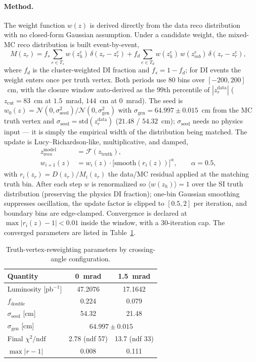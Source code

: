 \documentclass[11pt]{article}
\begin{document}
\paragraph{Method.} The weight function $w(z)$ is derived directly from the data
reco distribution with no closed-form Gaussian assumption. Under a candidate
weight, the mixed-MC reco distribution is built event-by-event,
\begin{equation}
  M(z_r) = f_s\!\!\sum_{e\in T_s}\! w(z^e_h)\,\delta(z_r-z^e_r)
         + f_d\!\!\sum_{e\in T_d}\! w(z^e_h)\,w(z^e_{mb})\,\delta(z_r-z^e_r),
\end{equation}
where $f_d$ is the cluster-weighted DI fraction and $f_s=1-f_d$; for DI events the
weight enters once per truth vertex. Both periods use $80$ bins over
$[-200,200]$~cm, with the closure window auto-derived as the $99$th percentile of
$|z_r^{\mathrm{data}}|$ ($z_{\mathrm{cut}}=83$~cm at $1.5$~mrad, $144$~cm at
$0$~mrad). The seed is
$w_0(z)=\mathcal{N}(0,\sigma_{\mathrm{seed}}^2)/\mathcal{N}(0,\sigma_{\mathrm{gen}}^2)$
with $\sigma_{\mathrm{gen}}=64.997\pm0.015$~cm from the MC truth vertex and
$\sigma_{\mathrm{seed}}=\mathrm{std}(z_r^{\mathrm{data}})$ ($21.48$ / $54.32$~cm);
$\sigma_{\mathrm{seed}}$ needs no physics input --- it is simply the empirical
width of the distribution being matched. The update is Lucy--Richardson-like,
multiplicative, and damped,
\begin{align}
  z_{\mathrm{reco}}^{\mathrm{model}} &= \mathcal{F}(z_{\mathrm{truth}}), \\
  w_{i+1}(z) &= w_i(z) \cdot \big[\mathrm{smooth}(r_i(z))\big]^{\alpha},
  \qquad \alpha=0.5,
\end{align}
with $r_i(z_r)=D(z_r)/M_i(z_r)$ the data/MC residual applied at the matching truth
bin. After each step $w$ is renormalized so $\langle w(z_h)\rangle=1$ over the SI
truth distribution (preserving the physics DI fraction); one-bin Gaussian
smoothing suppresses oscillation, the update factor is clipped to $[0.5,2]$ per
iteration, and boundary bins are edge-clamped. Convergence is declared at
$\max|r_i(z)-1|<0.01$ inside the window, with a $30$-iteration cap. The converged
parameters are listed in Table~\ref{tab:tvr}.

\begin{table}[h]
\centering
\caption{Truth-vertex-reweighting parameters by crossing-angle configuration.}
\label{tab:tvr}
\begin{tabular}{lcc}
\toprule
Quantity & 0~mrad & 1.5~mrad \\
\midrule
Luminosity [pb$^{-1}$] & 47.2076 & 17.1642 \\
$f_{\mathrm{double}}$ & 0.224 & 0.079 \\
$\sigma_{\mathrm{seed}}$ [cm] & 54.32 & 21.48 \\
$\sigma_{\mathrm{gen}}$ [cm] & \multicolumn{2}{c}{$64.997 \pm 0.015$} \\
Final $\chi^2/\mathrm{ndf}$ & 2.78 (ndf 57) & 13.7 (ndf 33) \\
$\max|r-1|$ & 0.008 & 0.111 \\
\bottomrule
\end{tabular}
\end{table}
\end{document}
